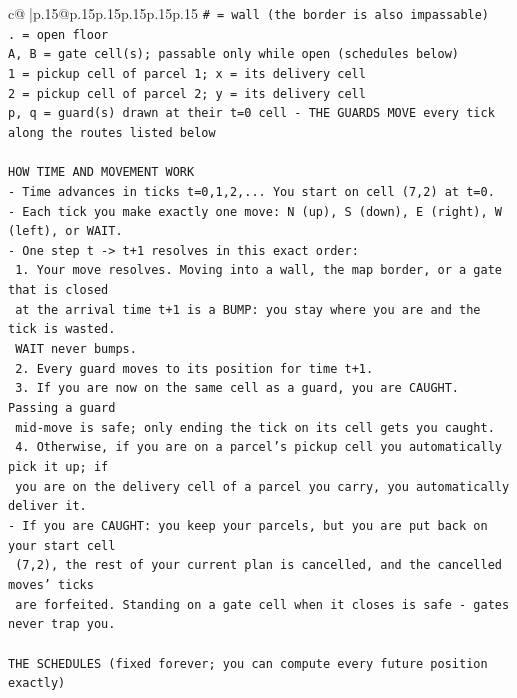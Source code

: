 \documentclass{article}
\begin{document}
{\begin{supertabular}{c@{$\;$}|p{.15\linewidth}@{}p{.15\linewidth}p{.15\linewidth}p{.15\linewidth}p{.15\linewidth}p{.15\linewidth}}
{{{\texttt{\# = wall (the border is also impassable)} \\
\texttt{. = open floor} \\
\texttt{A, B = gate cell(s); passable only while open (schedules below)} \\
\texttt{1 = pickup cell of parcel 1; x = its delivery cell} \\
\texttt{2 = pickup cell of parcel 2; y = its delivery cell} \\
\texttt{p, q = guard(s) drawn at their t=0 cell {-} THE GUARDS MOVE every tick along the routes listed below} \\
\\ 
\texttt{HOW TIME AND MOVEMENT WORK} \\
\texttt{{-} Time advances in ticks t=0,1,2,... You start on cell (7,2) at t=0.} \\
\texttt{{-} Each tick you make exactly one move: N (up), S (down), E (right), W (left), or WAIT.} \\
\texttt{{-} One step t {-}> t+1 resolves in this exact order:} \\
\texttt{  1. Your move resolves. Moving into a wall, the map border, or a gate that is closed} \\
\texttt{     at the arrival time t+1 is a BUMP: you stay where you are and the tick is wasted.} \\
\texttt{     WAIT never bumps.} \\
\texttt{  2. Every guard moves to its position for time t+1.} \\
\texttt{  3. If you are now on the same cell as a guard, you are CAUGHT. Passing a guard} \\
\texttt{     mid{-}move is safe; only ending the tick on its cell gets you caught.} \\
\texttt{  4. Otherwise, if you are on a parcel's pickup cell you automatically pick it up; if} \\
\texttt{     you are on the delivery cell of a parcel you carry, you automatically deliver it.} \\
\texttt{{-} If you are CAUGHT: you keep your parcels, but you are put back on your start cell} \\
\texttt{  (7,2), the rest of your current plan is cancelled, and the cancelled moves' ticks} \\
\texttt{  are forfeited. Standing on a gate cell when it closes is safe {-} gates never trap you.} \\
\\ 
\texttt{THE SCHEDULES (fixed forever; you can compute every future position exactly)} \\
}}}
\end{supertabular}}
\end{document}
